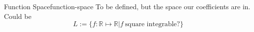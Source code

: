 \begin{definition}{Function Space}{function-space}
  To be defined, but the space our coefficients are in. Could be
  \[L := \{f: \mathbb{R} \mapsto \mathbb{R} | f ~\text{square integrable?}\}\]
\end{definition}
